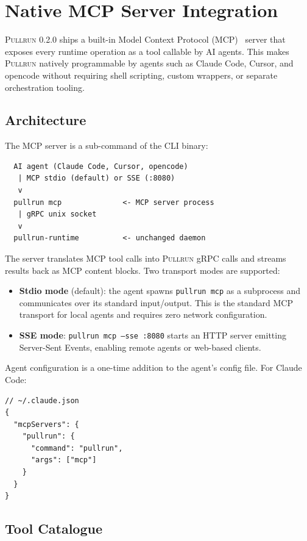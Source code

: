 \documentclass[11pt,a4paper]{article}
\newcommand{\pullrun}{\textsc{Pullrun}}
\begin{document}
\section{Native MCP Server Integration}\label{sec:mcp}

\pullrun{} 0.2.0 ships a built-in Model Context Protocol (MCP)~\cite{mcp} server that exposes every runtime operation as a tool callable by AI agents. This makes \pullrun{} natively programmable by agents such as Claude Code, Cursor, and opencode without requiring shell scripting, custom wrappers, or separate orchestration tooling.

\subsection{Architecture}

The MCP server is a sub-command of the CLI binary:

\begin{verbatim}
  AI agent (Claude Code, Cursor, opencode)
   | MCP stdio (default) or SSE (:8080)
   v
  pullrun mcp              <- MCP server process
   | gRPC unix socket
   v
  pullrun-runtime          <- unchanged daemon
\end{verbatim}

The server translates MCP tool calls into \pullrun{} gRPC calls and streams results back as MCP content blocks. Two transport modes are supported:

\begin{itemize}[leftmargin=*]
    \item \textbf{Stdio mode} (default): the agent spawns \texttt{pullrun mcp} as a subprocess and communicates over its standard input/output. This is the standard MCP transport for local agents and requires zero network configuration.
    \item \textbf{SSE mode}: \texttt{pullrun mcp --sse :8080} starts an HTTP server emitting Server-Sent Events, enabling remote agents or web-based clients.
\end{itemize}

Agent configuration is a one-time addition to the agent's config file. For Claude Code:

\begin{lstlisting}[language={}]
// ~/.claude.json
{
  "mcpServers": {
    "pullrun": {
      "command": "pullrun",
      "args": ["mcp"]
    }
  }
}
\end{lstlisting}

\subsection{Tool Catalogue}
\end{document}
